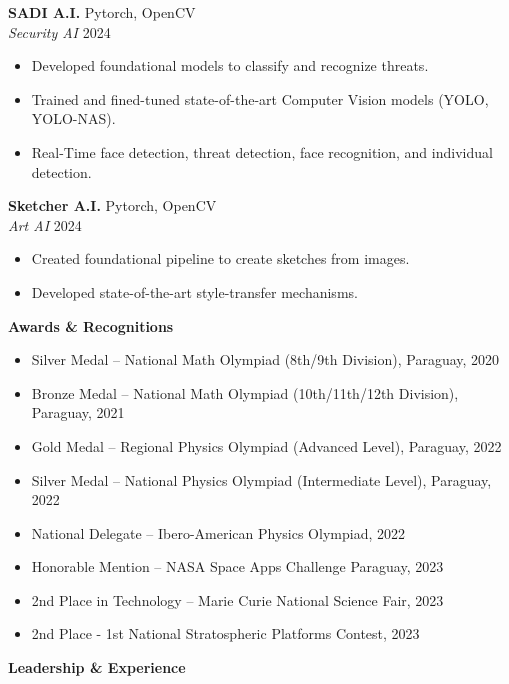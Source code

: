 \documentclass[11pt]{article}
\begin{document}
\textbf{SADI A.I.} \hfill Pytorch, OpenCV \\
\textit{Security AI} \hfill 2024
\begin{itemize}[noitemsep]
    \item Developed foundational models to classify and recognize threats.
    \item Trained and fined-tuned state-of-the-art Computer Vision models (YOLO, YOLO-NAS).
    \item Real-Time face detection, threat detection, face recognition, and individual detection.
\end{itemize}

\textbf{Sketcher A.I.} \hfill Pytorch, OpenCV \\
\textit{Art AI} \hfill 2024
\begin{itemize}[noitemsep]
    \item Created foundational pipeline to create sketches from images.
    \item Developed state-of-the-art style-transfer mechanisms.
\end{itemize}

\begin{center}
    \textbf{Awards \& Recognitions}
\end{center}

\begin{itemize}[noitemsep]
    \item Silver Medal – National Math Olympiad (8th/9th Division), Paraguay, 2020
    \item Bronze Medal – National Math Olympiad (10th/11th/12th Division), Paraguay, 2021
    \item Gold Medal – Regional Physics Olympiad (Advanced Level), Paraguay, 2022
    \item Silver Medal – National Physics Olympiad (Intermediate Level), Paraguay, 2022
    \item National Delegate – Ibero-American Physics Olympiad, 2022
    \item Honorable Mention – NASA Space Apps Challenge Paraguay, 2023
    \item 2nd Place in Technology – Marie Curie National Science Fair, 2023
    \item 2nd Place - 1st National Stratospheric Platforms Contest, 2023
\end{itemize}


\begin{center}
    \textbf{Leadership \& Experience}
\end{center}
\end{document}
